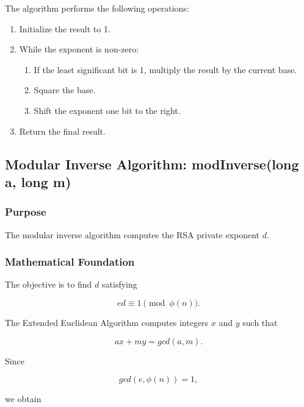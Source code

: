 \documentclass[12pt]{article}
\begin{document}
The algorithm performs the following operations:

\begin{enumerate}
\item Initialize the result to 1.
\item While the exponent is non-zero:
\begin{enumerate}
\item If the least significant bit is 1, multiply the result by the current base.
\item Square the base.
\item Shift the exponent one bit to the right.
\end{enumerate}
\item Return the final result.
\end{enumerate}


\subsection{Modular Inverse Algorithm: modInverse(long a, long m)}

\subsubsection{Purpose}

The modular inverse algorithm computes the RSA private exponent $d$.

\subsubsection{Mathematical Foundation}

The objective is to find $d$ satisfying

\begin{equation}
ed \equiv 1 \pmod{\phi(n)}.
\end{equation}

The Extended Euclidean Algorithm computes integers $x$ and $y$ such that

\begin{equation}
ax+my=gcd(a,m).
\end{equation}

Since

\begin{equation}
gcd(e,\phi(n))=1,
\end{equation}

we obtain
\end{document}

